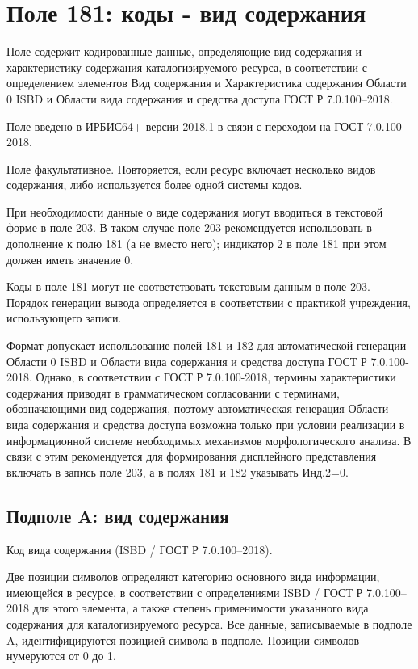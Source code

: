 \chapter{Поле 181: коды - вид содержания}

Поле содержит кодированные данные, определяющие вид содержания и характеристику содержания каталогизируемого ресурса, в соответствии с определением элементов Вид содержания и Характеристика содержания Области 0 ISBD и Области вида содержания и средства доступа ГОСТ Р 7.0.100–2018.

Поле введено в ИРБИС64+ версии 2018.1 в связи с переходом на ГОСТ 7.0.100-2018.

Поле факультативное. Повторяется, если ресурс включает несколько видов содержания, либо используется более одной системы кодов.

При необходимости данные о виде содержания могут вводиться в текстовой форме в поле 203. В таком случае поле 203 рекомендуется использовать в дополнение к полю 181 (а не вместо него); индикатор 2 в поле 181 при этом должен иметь значение 0.

Коды в поле 181 могут не соответствовать текстовым данным в поле 203. Порядок генерации вывода определяется в соответствии с практикой учреждения, использующего записи.

Формат допускает использование полей 181 и 182 для автоматической генерации Области 0 ISBD и Области вида содержания и средства доступа ГОСТ Р 7.0.100-2018. Однако, в соответствии с ГОСТ Р 7.0.100-2018, термины характеристики содержания приводят в грамматическом согласовании с терминами, обозначающими вид содержания, поэтому автоматическая генерация Области вида содержания и средства доступа возможна только при условии реализации в информационной системе необходимых механизмов морфологического анализа. В связи с этим рекомендуется для формирования дисплейного представления включать в запись поле 203, а в полях 181 и 182 указывать Инд.2=0.

\section{Подполе A: вид содержания}

Код вида содержания (ISBD / ГОСТ Р 7.0.100–2018).

Две позиции символов определяют категорию основного вида информации, имеющейся в ресурсе, в соответствии с определениями ISBD / ГОСТ Р 7.0.100–2018 для этого элемента, а также степень применимости указанного вида содержания для каталогизируемого ресурса. Все данные, записываемые в подполе A, идентифицируются позицией символа в подполе. Позиции символов нумеруются от 0 до 1.

